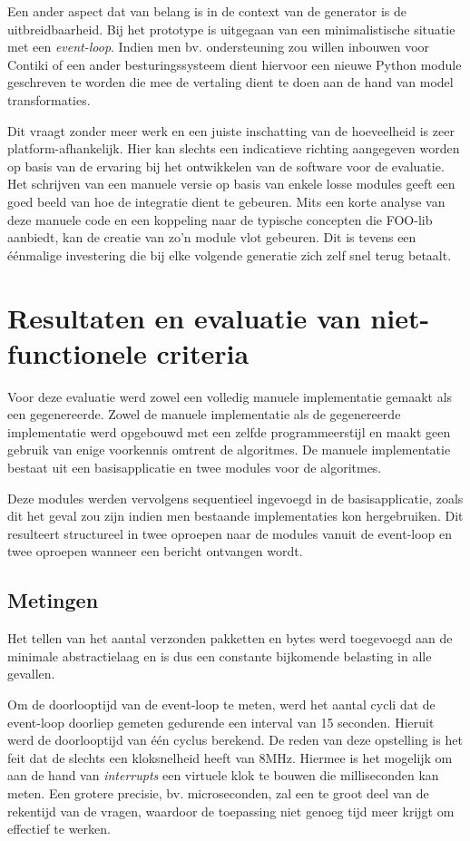 Een ander aspect dat van belang is in de context van de generator is de
uitbreidbaarheid. Bij het prototype is uitgegaan van een minimalistische
situatie met een \emph{event-loop}. Indien men bv. ondersteuning zou willen
inbouwen voor Contiki of een ander besturingssysteem dient hiervoor een nieuwe
Python module geschreven te worden die mee de vertaling dient te doen aan de
hand van model transformaties.

Dit vraagt zonder meer werk en een juiste inschatting van de hoeveelheid is
zeer platform-afhankelijk. Hier kan slechts een indicatieve richting aangegeven
worden op basis van de ervaring bij het ontwikkelen van de software voor de
evaluatie. Het schrijven van een manuele versie op basis van enkele losse
modules geeft een goed beeld van hoe de integratie dient te gebeuren. Mits een
korte analyse van deze manuele code en een koppeling naar de typische concepten
die FOO-lib aanbiedt, kan de creatie van zo'n module vlot gebeuren. Dit is
tevens een \'e\'enmalige investering die bij elke volgende generatie zich zelf
snel terug betaalt.

\section{Resultaten en evaluatie van niet-functionele criteria}
\label{section:results}

Voor deze evaluatie werd zowel een volledig manuele implementatie gemaakt als
een gegenereerde. Zowel de manuele implementatie als de gegenereerde
implementatie werd opgebouwd met een zelfde programmeerstijl en maakt geen
gebruik van enige voorkennis omtrent de algoritmes. De manuele implementatie
bestaat uit een basisapplicatie en twee modules voor de algoritmes.

Deze modules werden vervolgens sequentieel ingevoegd in de basisapplicatie,
zoals dit het geval zou zijn indien men bestaande implementaties kon
hergebruiken. Dit resulteert structureel in twee oproepen naar de modules
vanuit de event-loop en twee oproepen wanneer een bericht ontvangen wordt.

\subsection{Metingen}

Het tellen van het aantal verzonden pakketten en bytes werd toegevoegd aan de
minimale abstractielaag en is dus een constante bijkomende belasting in alle
gevallen.

Om de doorlooptijd van de event-loop te meten, werd het aantal cycli dat de
event-loop doorliep gemeten gedurende een interval van 15 seconden. Hieruit
werd de doorlooptijd van \'e\'en cyclus berekend. De reden van deze opstelling
is het feit dat de \mcu slechts een kloksnelheid heeft van 8MHz. Hiermee is het
mogelijk om aan de hand van \emph{interrupts} een virtuele klok te bouwen die
milliseconden kan meten. Een grotere precisie, bv. microseconden, zal een te
groot deel van de rekentijd van de \mcu vragen, waardoor de toepassing niet
genoeg tijd meer krijgt om effectief te werken.

